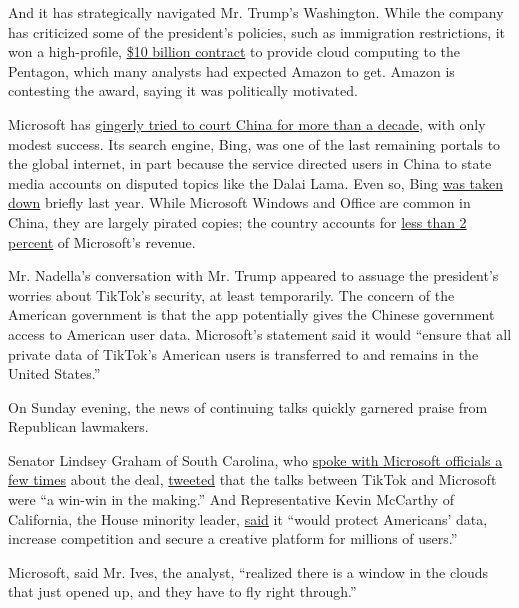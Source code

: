 And it has strategically navigated Mr. Trump's Washington. While the
company has criticized some of the president's policies, such as
immigration restrictions, it won a high-profile,
\href{https://www.nytimes.com/2019/10/25/technology/dod-jedi-contract.html}{\$10
billion contract} to provide cloud computing to the Pentagon, which many
analysts had expected Amazon to get. Amazon is contesting the award,
saying it was politically motivated.

Microsoft has
\href{https://www.nytimes.com/2019/01/23/business/china-microsoft-bing.html}{gingerly
tried to court China for more than a decade}, with only modest success.
Its search engine, Bing, was one of the last remaining portals to the
global internet, in part because the service directed users in China to
state media accounts on disputed topics like the Dalai Lama. Even so,
Bing
\href{https://www.nytimes.com/2019/01/24/technology/microsoft-bing-china.html}{was
taken down} briefly last year. While Microsoft Windows and Office are
common in China, they are largely pirated copies; the country accounts
for
\href{https://www.nytimes.com/2020/02/26/technology/microsoft-coronavirus-earnings.html}{less
than 2 percent} of Microsoft's revenue.

Mr. Nadella's conversation with Mr. Trump appeared to assuage the
president's worries about TikTok's security, at least temporarily. The
concern of the American government is that the app potentially gives the
Chinese government access to American user data. Microsoft's statement
said it would ``ensure that all private data of TikTok's American users
is transferred to and remains in the United States.''

On Sunday evening, the news of continuing talks quickly garnered praise
from Republican lawmakers.

Senator Lindsey Graham of South Carolina, who
\href{https://www.nytimes.com/2020/08/02/business/economy/trump-tiktok-china-national-security.html}{spoke
with Microsoft officials a few times} about the deal,
\href{https://twitter.com/LindseyGrahamSC/status/1290083628261584896}{tweeted}
that the talks between TikTok and Microsoft were ``a win-win in the
making.'' And Representative Kevin McCarthy of California, the House
minority leader,
\href{https://twitter.com/GOPLeader/status/1290037004797804544}{said} it
``would protect Americans' data, increase competition and secure a
creative platform for millions of users.''

Microsoft, said Mr. Ives, the analyst, ``realized there is a window in
the clouds that just opened up, and they have to fly right through.''

